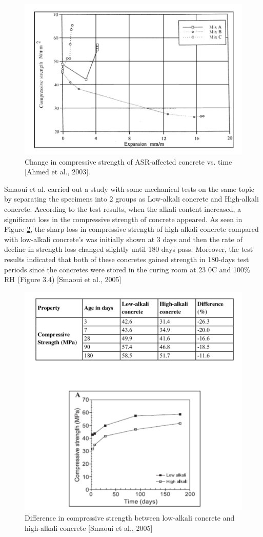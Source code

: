 \begin{figure}[h!]
  \centering
  \includegraphics[width=0.8\linewidth]{Reference/temp2.png}
  \caption{Change in compressive strength of ASR-affected concrete vs. time [Ahmed et al., 2003].}
  \label{Ahmed et al., 2003 2}
\end{figure}

\clearpage

Smaoui et al. carried out a study with some mechanical tests on the same topic by separating the specimens into 2 groups as Low-alkali concrete and High-alkali concrete. According to the test results, when the alkali content increased, a significant loss in the compressive strength of concrete appeared. As seen in Figure \ref{Smaoui et al., 2005 1}, the sharp loss in compressive strength of high-alkali concrete compared with low-alkali concrete's was initially shown at 3 days and then the rate of decline in strength loss changed slightly until 180 days pass. Moreover, the test results indicated that both of these concretes gained strength in 180-days test periods since the concretes were stored in the curing room at 23 0C and 100\% RH (Figure 3.4) [Smaoui et al., 2005]

\begin{figure}
  \centering
  \includegraphics[width=0.8\linewidth]{Reference/temp7.png}
  \caption{Difference in compressive strength between low-alkali concrete and high-alkali concrete [Smaoui et al., 2005]}
  \label{Smaoui et al., 2005 1}
\end{figure}

